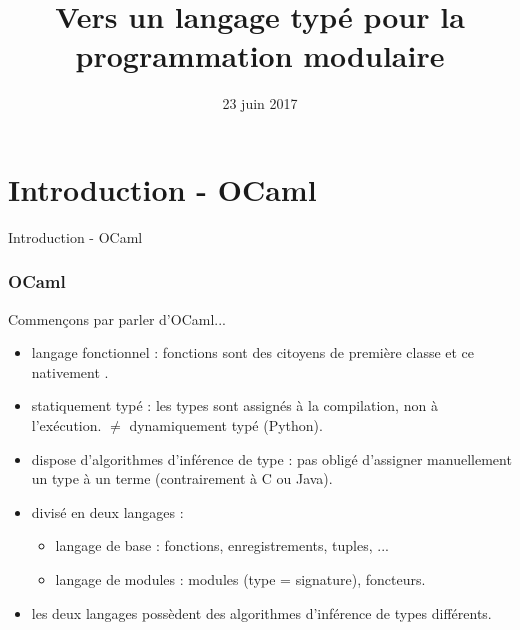 \documentclass{beamer}
\begin{document}
\title{Vers un langage typé pour la programmation modulaire}
\date{23 juin 2017}

\maketitle

\begin{frame}
	\tableofcontents
\end{frame}

\section{Introduction - OCaml}

\begin{frame}
	\begin{center}
		\Huge{Introduction - OCaml}
	\end{center}
\end{frame}

\begin{frame}
  \frametitle{OCaml}
  Commençons par parler d'OCaml...
	\begin{center}
    \begin{itemize}
    \item langage fonctionnel : fonctions sont des citoyens de première classe
      et ce \og nativement \fg.
    \item statiquement typé : les types sont assignés à la compilation, non à
      l'exécution. $\neq$ dynamiquement typé (Python).
    \item dispose d'algorithmes d'inférence de type : pas obligé d'assigner
      manuellement un type à un terme (contrairement à C ou Java).
    \item divisé en deux \og langages \fg :
      \begin{itemize}
      \item langage de base : fonctions, enregistrements, tuples, ...
      \item langage de modules : modules (type = signature), foncteurs.
      \end{itemize}
    \item les deux langages possèdent des algorithmes d'inférence de types différents.
    \end{itemize}
	\end{center}
\end{frame}

\begin{frame}
  \inputminted{OCaml}{codes/intro_point2D.ml}
  \begin{center}
  \end{center}
\end{frame}
\end{document}

